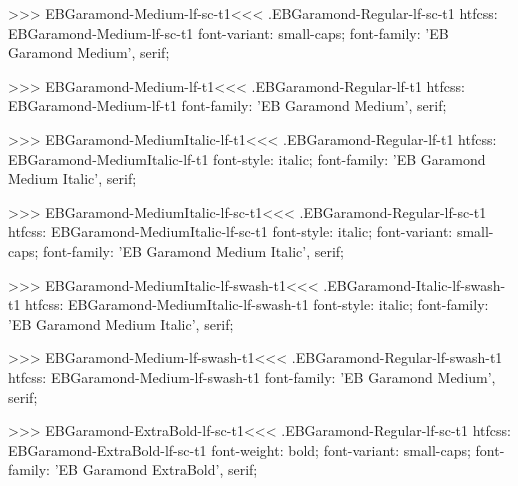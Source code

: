 {{{{{{{>>>
\<EBGaramond-Medium-lf-sc-t1\><<<
.EBGaramond-Regular-lf-sc-t1
htfcss:  EBGaramond-Medium-lf-sc-t1  font-variant: small-caps; font-family: 'EB Garamond Medium', serif;

>>>
\<EBGaramond-Medium-lf-t1\><<<
.EBGaramond-Regular-lf-t1
htfcss:  EBGaramond-Medium-lf-t1  font-family: 'EB Garamond Medium', serif;

>>>
\<EBGaramond-MediumItalic-lf-t1\><<<
.EBGaramond-Regular-lf-t1
htfcss:  EBGaramond-MediumItalic-lf-t1  font-style: italic; font-family: 'EB Garamond Medium Italic', serif;

>>>
\<EBGaramond-MediumItalic-lf-sc-t1\><<<
.EBGaramond-Regular-lf-sc-t1
htfcss:  EBGaramond-MediumItalic-lf-sc-t1  font-style: italic; font-variant: small-caps; font-family: 'EB Garamond Medium Italic', serif;

>>>
\<EBGaramond-MediumItalic-lf-swash-t1\><<<
.EBGaramond-Italic-lf-swash-t1
htfcss:  EBGaramond-MediumItalic-lf-swash-t1  font-style: italic; font-family: 'EB Garamond Medium Italic', serif;

>>>
\<EBGaramond-Medium-lf-swash-t1\><<<
.EBGaramond-Regular-lf-swash-t1
htfcss:  EBGaramond-Medium-lf-swash-t1  font-family: 'EB Garamond Medium', serif;

>>>
\<EBGaramond-ExtraBold-lf-sc-t1\><<<
.EBGaramond-Regular-lf-sc-t1
htfcss:  EBGaramond-ExtraBold-lf-sc-t1  font-weight: bold; font-variant: small-caps; font-family: 'EB Garamond ExtraBold', serif;

}}}}}}}
